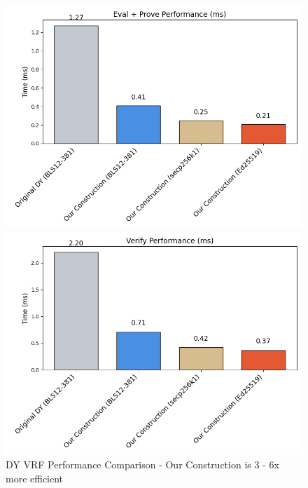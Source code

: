\begin{figure}[ht]
    \begin{minipage}{0.48\textwidth}
        \centering
         \includegraphics[width=\textwidth]{figures/chap4_public_vrf_eval_prove_performance.png}        
    \end{minipage}
    \hfill
    \begin{minipage}{0.48\textwidth}
        \centering
       \includegraphics[width=\textwidth]{figures/chap4_public_vrf_verify_performance.png}
    \end{minipage}
    
    \caption[Our DY VRF Construction is 3 - 6x more efficient]{DY VRF Performance Comparison - Our Construction is 3 - 6x more efficient}
    \label{fig:chap4_public_vrf}
\end{figure}
